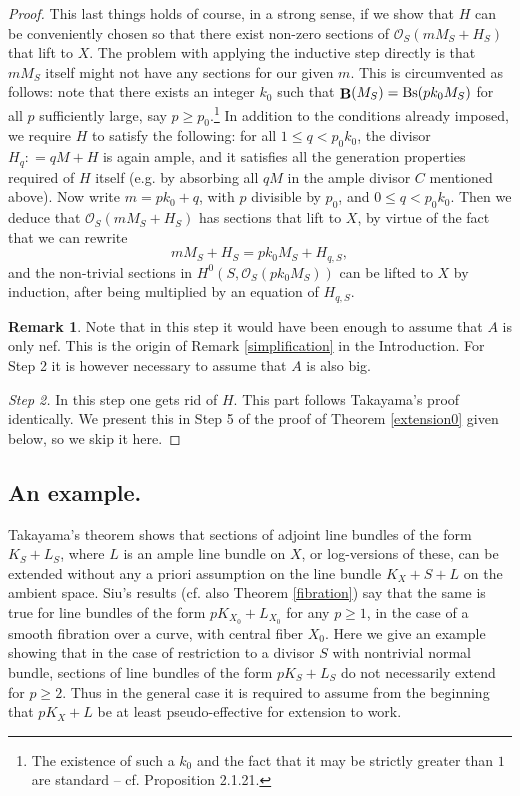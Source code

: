 \documentclass[11pt]{amsart}
\theoremstyle{plain}
\theoremstyle{definition}
\newtheorem{remark}[theorem]{Remark}
\newcommand{\OO}{\mathcal  {O}}
\DeclareMathOperator{\BB}{{\bf B}}
\begin{document}
\begin{proof}
This last things holds of course, in a strong sense, if we show that $H$ can be conveniently chosen so that 
there exist non-zero sections of $\OO_S(mM_S + H_S)$ that lift to $X$. The problem with applying the inductive step 
directly is that $mM_S$ itself might not have any sections for our given $m$. This is circumvented as follows: 
note that there exists an integer $k_0$ such that $\BB(M_S) = {\rm Bs}(pk_0M_S)$ for all $p$ sufficiently large, say $p \ge p_0.$\footnote{The existence of such a $k_0$ and the fact that it may be strictly greater than $1$ are standard -- cf. \cite{positivity} Proposition 2.1.21.} In addition to the conditions already imposed, we require $H$ to satisfy the following:
for all $1\le q < p_0k_0$, the divisor $H_q : = q M + H$ is again ample, and it satisfies all the generation properties required of $H$ itself (e.g. by absorbing all $q M$ in the ample divisor $C$ mentioned above). Now write $m = pk_0 + q$, with $p$ divisible by $p_0$, and $0\le q < p_0k_0$. Then we deduce that $\OO_S(mM_S + H_S)$ has sections that lift to $X$, by virtue of the fact that we can rewrite 
$$mM_S + H_S = p k_0 M_S + H_{q, S},$$
and the non-trivial sections in $H^0 (S, \OO_S(p k_0 M_S))$ can be lifted to $X$ by induction, after being multiplied by an equation of $H_{q, S}$.

\begin{remark}
Note that in this step it would have been enough to assume that $A$ is only nef. This is the origin of 
Remark \ref{simplification} in the Introduction. For Step 2 it is however necessary to assume that $A$ 
is also big.
\end{remark}

\noindent
\emph{Step 2.} In this step one gets rid of $H$. This part follows Takayama's proof identically. We present this in Step 5 of the proof of Theorem \ref{extension0}  given below, so we skip it here.  
\end{proof}



\subsection*{An example.}
Takayama's theorem shows that sections of adjoint line bundles of the form $K_S + L_S$, where $L$ is an ample line bundle on $X$, or log-versions of these, can be extended without any a priori assumption on the line bundle  $K_X + S + L$ on the ambient space. Siu's results (cf. also Theorem \ref{fibration}) say that the same is 
true for line bundles of the form $p K_{X_0} + L_{X_0}$ for any $p\ge 1$, in the case of a smooth 
fibration over a curve, with central fiber $X_0$.
Here we give an example showing that in the case of restriction to a divisor $S$ with nontrivial 
normal bundle, sections of line bundles of the form $p K_S + L_S$ do not necessarily extend 
for $p \ge 2$. Thus in the general case it is required to assume from the beginning that 
$p K_X + L $ be at least pseudo-effective for extension to work.
\end{document}
